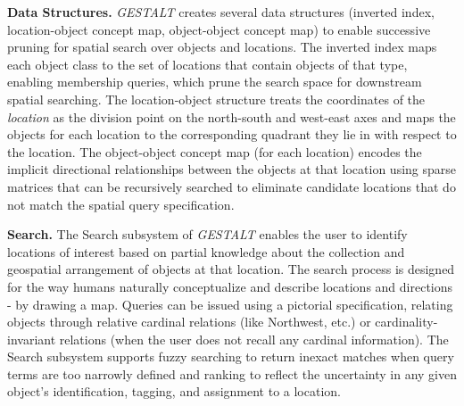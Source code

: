 \textbf{Data Structures.}
\emph{GESTALT} creates several data structures (inverted index, location-object concept map, object-object concept map) to enable successive pruning for spatial search over objects and locations. 
The inverted index maps each object class to the set of locations that contain objects of that type, enabling membership queries, which prune the search space for downstream spatial searching. 
The location-object structure treats the coordinates of the \textit{location} as the division point on the north-south and west-east axes and maps the objects for each location to the corresponding quadrant they lie in with respect to the location.
The object-object concept map (for each location) encodes the implicit directional relationships between the objects at that location using sparse matrices that can be recursively searched to eliminate candidate locations that do not match the spatial query specification. 

\textbf{Search.}
The Search subsystem of \emph{GESTALT} enables the user to identify locations of interest based on partial knowledge about the collection and geospatial arrangement of objects at that location. 
The search process is designed for the way humans naturally conceptualize and describe locations and directions - by drawing a map.
Queries can be issued using a pictorial specification, relating objects through relative cardinal relations (like Northwest, etc.) or cardinality-invariant relations (when the user does not recall any cardinal information).
The Search subsystem supports fuzzy searching to return inexact matches when query terms are too narrowly defined and ranking to reflect the uncertainty in any given object's identification, tagging, and assignment to a location.


